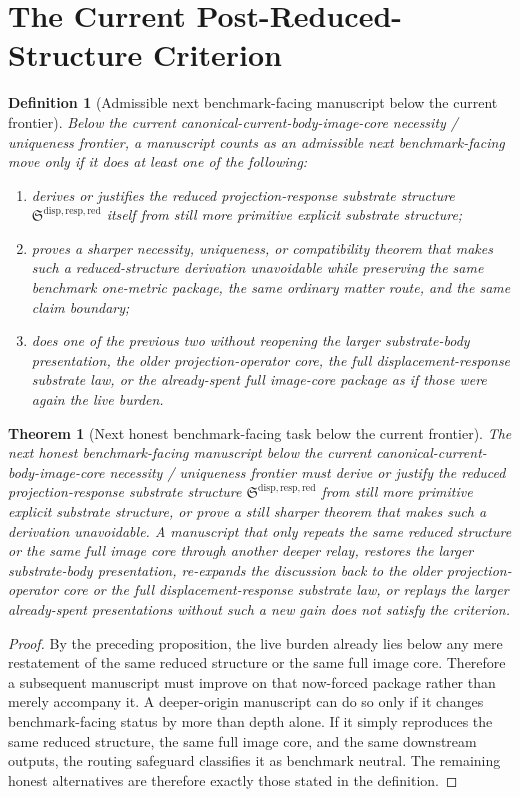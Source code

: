 \documentclass[11pt]{article}
\newcommand{\ReducedStructure}{\mathfrak S^{\mathrm{disp,resp,red}}}
\newtheorem{definition}{Definition}
\newtheorem{theorem}{Theorem}
\begin{document}
\section{The Current Post-Reduced-Structure Criterion}

\begin{definition}[Admissible next benchmark-facing manuscript below the current frontier]
Below the current canonical-current-body-image-core necessity / uniqueness frontier, a manuscript counts as an admissible next benchmark-facing move only if it does at least one of the following:
\begin{enumerate}
    \item derives or justifies the reduced projection-response substrate structure \(\ReducedStructure\) itself from still more primitive explicit substrate structure;
    \item proves a sharper necessity, uniqueness, or compatibility theorem that makes such a reduced-structure derivation unavoidable while preserving the same benchmark one-metric package, the same ordinary matter route, and the same claim boundary;
    \item does one of the previous two without reopening the larger substrate-body presentation, the older projection-operator core, the full displacement-response substrate law, or the already-spent full image-core package as if those were again the live burden.
\end{enumerate}
\end{definition}

\begin{theorem}[Next honest benchmark-facing task below the current frontier]
The next honest benchmark-facing manuscript below the current canonical-current-body-image-core necessity / uniqueness frontier must derive or justify the reduced projection-response substrate structure \(\ReducedStructure\) from still more primitive explicit substrate structure, or prove a still sharper theorem that makes such a derivation unavoidable. A manuscript that only repeats the same reduced structure or the same full image core through another deeper relay, restores the larger substrate-body presentation, re-expands the discussion back to the older projection-operator core or the full displacement-response substrate law, or replays the larger already-spent presentations without such a new gain does not satisfy the criterion.
\end{theorem}

\begin{proof}
By the preceding proposition, the live burden already lies below any mere restatement of the same reduced structure or the same full image core. Therefore a subsequent manuscript must improve on that now-forced package rather than merely accompany it. A deeper-origin manuscript can do so only if it changes benchmark-facing status by more than depth alone. If it simply reproduces the same reduced structure, the same full image core, and the same downstream outputs, the routing safeguard classifies it as benchmark neutral. The remaining honest alternatives are therefore exactly those stated in the definition.
\end{proof}
\end{document}
